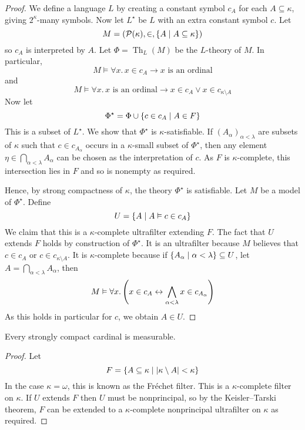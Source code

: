 \begin{proof}
    We define a language \( L \) by creating a constant symbol \( c_A \) for each \( A \subseteq \kappa \), giving \( 2^\kappa \)-many symbols.
    Now let \( L^\star \) be \( L \) with an extra constant symbol \( c \).
    Let
    \[ M = (\mathcal P(\kappa), \in, \qty{A \mid A \subseteq \kappa}) \]
    so \( c_A \) is interpreted by \( A \).
    Let \( \Phi = \operatorname{Th}_L(M) \) be the \( L \)-theory of \( M \).
    In particular,
    \[ M \vDash \forall x.\, x \in c_A \to x \text{ is an ordinal} \]
    and
    \[ M \vDash \forall x.\, x \text{ is an ordinal} \to x \in c_A \vee x \in c_{\kappa \setminus A} \]
    Now let
    \[ \Phi^\star = \Phi \cup \qty{c \in c_A \mid A \in F} \]
    This is a subset of \( L^\star \).
    We show that \( \Phi^\star \) is \( \kappa \)-satisfiable.
    If \( (A_\alpha)_{\alpha < \lambda} \) are subsets of \( \kappa \) such that \( c \in c_{A_\alpha} \) occurs in a \( \kappa \)-small subset of \( \Phi^\star \), then any element \( \eta \in \bigcap_{\alpha < \lambda} A_\alpha \) can be chosen as the interpretation of \( c \).
    As \( F \) is \( \kappa \)-complete, this intersection lies in \( F \) and so is nonempty as required.

    Hence, by strong compactness of \( \kappa \), the theory \( \Phi^\star \) is satisfiable.
    Let \( M \) be a model of \( \Phi^\star \).
    Define
    \[ U = \qty{A \mid A \vDash c \in c_A} \]
    We claim that this is a \( \kappa \)-complete ultrafilter extending \( F \).
    The fact that \( U \) extends \( F \) holds by construction of \( \Phi^\star \).
    It is an ultrafilter because \( M \) believes that \( c \in c_A \) or \( c \in c_{\kappa \setminus A} \).
    It is \( \kappa \)-complete because if \( \qty{A_\alpha \mid \alpha < \lambda} \subseteq U \), let \( A = \bigcap_{\alpha < \lambda} A_\alpha \), then
    \[ M \vDash \forall x.\, \qty(x \in c_A \leftrightarrow \bigwedge_{\alpha < \lambda} x \in c_{A_\alpha}) \]
    As this holds in particular for \( c \), we obtain \( A \in U \).
\end{proof}
\begin{corollary}
    Every strongly compact cardinal is measurable.
\end{corollary}
\begin{proof}
    Let
    \[ F = \qty{A \subseteq \kappa \mid \abs{\kappa\setminus A} < \kappa} \]
    In the case \( \kappa = \omega \), this is known as the Fr\'echet filter.
    This is a \( \kappa \)-complete filter on \( \kappa \).
    If \( U \) extends \( F \) then \( U \) must be nonprincipal, so by the Keisler--Tarski theorem, \( F \) can be extended to a \( \kappa \)-complete nonprincipal ultrafilter on \( \kappa \) as required.
\end{proof}

